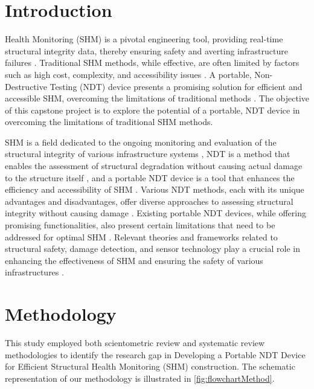 \documentclass[journal, a4paper]{IEEEtran}
\begin{document}
\section{Introduction}
 Health Monitoring (SHM) is a pivotal engineering tool, providing real-time structural integrity data,
thereby ensuring safety and averting infrastructure failures \cite{gharehbaghi_critical_2022} \cite{katam_review_2023}.
Traditional SHM methods, while effective, are often limited by factors such as
high cost, complexity, and accessibility issues \cite{katam_review_2023} \cite{gharehbaghi_critical_2022}.
A portable, Non-Destructive Testing (NDT) device presents a promising solution for efficient and accessible SHM,
overcoming the limitations of traditional methods \cite{guo_portable_2022} \cite{chen_research_2023}.
The objective of this capstone project is to explore the potential of a portable,
NDT device in overcoming the limitations of traditional SHM methods.

SHM is a field dedicated to the ongoing monitoring and evaluation of the structural integrity
of various infrastructure systems \cite{katam_review_2023}, NDT is a method that enables the assessment
of structural degradation without causing actual damage to the structure itself \cite{katam_review_2023},
and a portable NDT device is a tool that enhances the efficiency and accessibility of SHM \cite{hassani_systematic_2023} \cite{katam_review_2023}.
Various NDT methods, each with its unique advantages and disadvantages,
offer diverse approaches to assessing structural integrity without causing damage \cite{khedmatgozar_dolati_non-destructive_2021}.
Existing portable NDT devices, while offering promising functionalities,
also present certain limitations that need to be addressed for optimal SHM \cite{hassani_systematic_2023}.
Relevant theories and frameworks related to structural safety, damage detection,
and sensor technology play a crucial role in enhancing the effectiveness of SHM
and ensuring the safety of various infrastructures \cite{chen_sensor_2021} \cite{gharehbaghi_critical_2022}.


\section{Methodology}
This study employed both scientometric review and systematic review methodologies to identify the research gap in
Developing a Portable NDT Device for Efficient Structural Health Monitoring (SHM) construction.
The schematic representation of our methodology is illustrated in \autoref{fig:flowchartMethod}.
\end{document}
